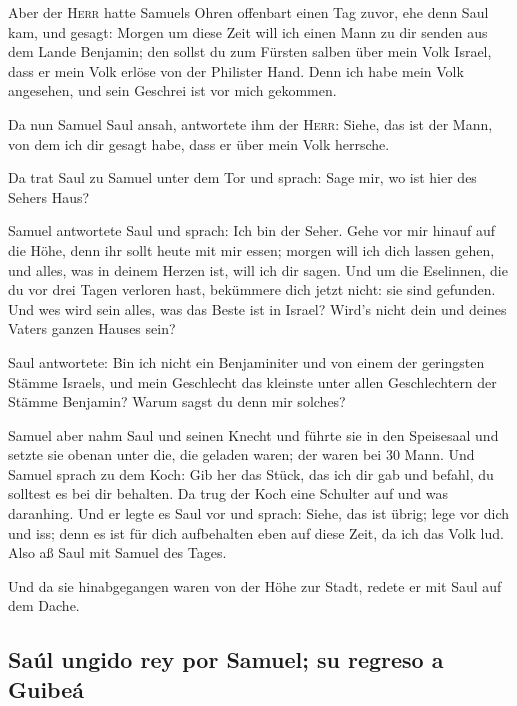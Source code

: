  Aber der \textsc{Herr} hatte Samuels Ohren offenbart
einen Tag zuvor, ehe denn Saul kam, und gesagt:  Morgen
um diese Zeit will ich einen Mann zu dir senden aus dem Lande Benjamin;
den sollst du zum Fürsten salben über mein Volk Israel, dass er mein
Volk erlöse von der Philister Hand. Denn ich habe mein Volk angesehen,
und sein Geschrei ist vor mich gekommen.

 Da nun Samuel Saul ansah, antwortete ihm der
\textsc{Herr}: Siehe, das ist der Mann, von dem ich dir gesagt habe,
dass er über mein Volk herrsche.

 Da trat Saul zu Samuel unter dem Tor und sprach: Sage
mir, wo ist hier des Sehers Haus?

 Samuel antwortete Saul und sprach: Ich bin der Seher.
Gehe vor mir hinauf auf die Höhe, denn ihr sollt heute mit mir essen;
morgen will ich dich lassen gehen, und alles, was in deinem Herzen ist,
will ich dir sagen.  Und um die Eselinnen, die du vor
drei Tagen verloren hast, bekümmere dich jetzt nicht: sie sind gefunden.
Und wes wird sein alles, was das Beste ist in Israel? Wird's nicht dein
und deines Vaters ganzen Hauses sein?

 Saul antwortete: Bin ich nicht ein Benjaminiter und von
einem der geringsten Stämme Israels, und mein Geschlecht das kleinste
unter allen Geschlechtern der Stämme Benjamin? Warum sagst du denn mir
solches?

 Samuel aber nahm Saul und seinen Knecht und führte sie
in den Speisesaal und setzte sie obenan unter die, die geladen waren;
der waren bei 30 Mann.  Und Samuel sprach zu dem Koch:
Gib her das Stück, das ich dir gab und befahl, du solltest es bei dir
behalten.  Da trug der Koch eine Schulter auf und was
daranhing. Und er legte es Saul vor und sprach: Siehe, das ist übrig;
lege vor dich und iss; denn es ist für dich aufbehalten eben auf diese
Zeit, da ich das Volk lud. Also aß Saul mit Samuel des Tages.

 Und da sie hinabgegangen waren von der Höhe zur Stadt,
redete er mit Saul auf dem Dache.

\hypertarget{sauxfal-ungido-rey-por-samuel-su-regreso-a-guibeuxe1}{%
\subsection{Saúl ungido rey por Samuel; su regreso a
Guibeá}\label{sauxfal-ungido-rey-por-samuel-su-regreso-a-guibeuxe1}}

